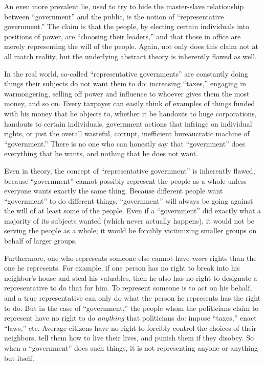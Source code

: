 \documentclass{book}
\begin{document}
An even more prevalent lie, used to try to hide the master-slave relationship between \enquote{government} and the public, is the notion of \enquote{representative government.} The claim is that the people, by electing certain individuals into positions of power, are \enquote{choosing their leaders,} and that those in office are merely representing the will of the people. Again, not only does this claim not at all match reality, but the underlying abstract theory is inherently flawed as well.

In the real world, so-called \enquote{representative governments} are constantly doing things their subjects do not want them to do: increasing \enquote{taxes,} engaging in warmongering, selling off power and influence to whoever gives them the most money, and so on. Every taxpayer can easily think of examples of things funded with his money that he objects to, whether it be handouts to huge corporations, handouts to certain individuals, government actions that infringe on individual rights, or just the overall wasteful, corrupt, inefficient bureaucratic machine of \enquote{government.} There is no one who can honestly say that \enquote{government} does everything that he wants, and nothing that he does not want.

Even in theory, the concept of \enquote{representative government} is inherently flawed, because \enquote{government} cannot possibly represent the people as a whole unless everyone wants exactly the same thing. Because different people want \enquote{government} to do different things, \enquote{government} will always be going against the will of at least some of the people. Even if a \enquote{government} did exactly what a majority of its subjects wanted (which never actually happens), it would not be serving the people as a whole; it would be forcibly victimizing smaller groups on behalf of larger groups.

Furthermore, one who represents someone else cannot have \emph{more} rights than the one he represents. For example, if one person has no right to break into his neighbor's house and steal his valuables, then he also has no right to designate a representative to do that for him. To represent someone is to act on his behalf, and a true representative can only do what the person he represents has the right to do. But in the case of \enquote{government,} the people whom the politicians claim to represent have no right to do \emph{anything} that politicians do: impose \enquote{taxes,} enact \enquote{laws,} etc. Average citizens have no right to forcibly control the choices of their neighbors, tell them how to live their lives, and punish them if they disobey. So when a \enquote{government} does such things, it is not representing anyone or anything but itself.
\end{document}
